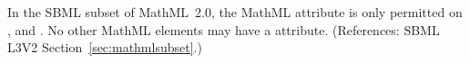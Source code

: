 In the SBML subset of MathML~2.0, the MathML attribute
 is only permitted on ,  and
.  No other MathML elements may have a
 attribute.  (References: SBML L3V2
Section~\ref{sec:mathmlsubset}.) 
